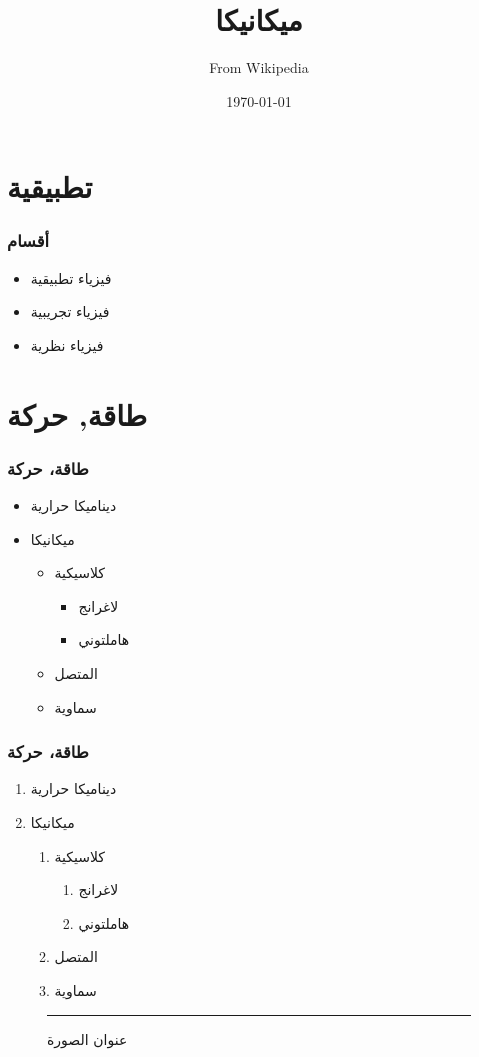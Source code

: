 \documentclass[hyperref=unicode]{beamer}
\title{ميكانيكا}
\author{From Wikipedia}
\date{\today}
\begin{document}
\begin{frame}
\titlepage
\end{frame}

\begin{frame}
\frametitle{\contentsname}
\tableofcontents
\end{frame}

\section{تطبيقية}

\begin{frame}
\frametitle{أقسام}
\begin{itemize}
\item فيزياء تطبيقية
\item فيزياء تجريبية
\item فيزياء نظرية
\end{itemize}



\end{frame}

\section{طاقة, حركة}

\begin{frame}
\frametitle{طاقة، حركة}
\begin{itemize}
\item ديناميكا حرارية
\item ميكانيكا
\begin{itemize}
\item كلاسيكية
\begin{itemize}
\item لاغرانج
\item هاملتوني
\end{itemize}
\item المتصل
\item سماوية
\end{itemize}
\end{itemize}
\end{frame}

\begin{frame}
\frametitle{طاقة، حركة}
\begin{enumerate}
\item ديناميكا حرارية
\item ميكانيكا
\begin{enumerate}
\item كلاسيكية
\begin{enumerate}
\item لاغرانج
\item هاملتوني
\end{enumerate}
\item المتصل
\item سماوية
\end{enumerate}
\end{enumerate}

\begin{figure}
\centering
\rule{2cm}{2cm}
\caption{عنوان الصورة}
\end{figure}


\end{frame}
\end{document}

